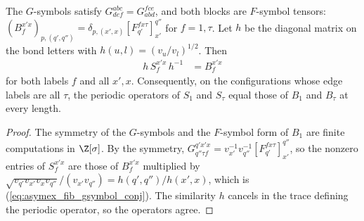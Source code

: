 \begin{lemma}
    \label{thm:asymex_fib_gsymbol_similarity}
    \leanok
    The $G$-symbols satisfy $G^{abc}_{def}=G^{fce}_{abd}$, and both blocks
    are $F$-symbol tensors:
    $(B_f^{x'x})_{p,(q',q'')}=\delta_{p,(x',x)}[F^{fx\tau}_{q'}]_{x'}^{q''}$
    for $f=1,\tau$. Let $h$ be the diagonal
    matrix on the bond letters with $h(u,l)=(v_u/v_l)^{1/2}$. Then
    \begin{align}
        h\,S_f^{x'x}\,h^{-1} & =B_f^{x'x}
        \label{eq:asymex_fib_gsymbol_conj}
    \end{align}
    for both labels $f$ and all $x',x$. Consequently, on the
    configurations whose edge labels are all $\tau$, the periodic operators
    of $S_1$ and $S_\tau$ equal those of $B_1$ and $B_\tau$ at every length.
\end{lemma}

\begin{proof}
    \leanok
    The symmetry of the $G$-symbols and the $F$-symbol form of $B_1$ are
    finite computations in $\Z[\sigma]$. By the symmetry,
    $G^{q'x'x}_{q''\tau f}=v_{x'}^{-1}v_{q''}^{-1}[F^{fx\tau}_{q'}]_{x'}^{q''}$,
    so the nonzero entries of $S_f^{x'x}$ are those of $B_f^{x'x}$ multiplied
    by
    $\sqrt{v_{q'}v_{x'}v_xv_{q''}}/(v_{x'}v_{q''})=h(q',q'')/h(x',x)$, which
    is (\ref{eq:asymex_fib_gsymbol_conj}). The similarity $h$ cancels in the
    trace defining the periodic operator, so the operators agree.
\end{proof}

